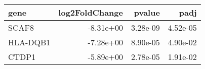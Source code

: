 \begin{tabular}{lrrr}
\toprule
    gene &  log2FoldChange &   pvalue &     padj \\
\midrule
   SCAF8 &       -8.31e+00 & 3.28e-09 & 4.52e-05 \\
HLA-DQB1 &       -7.28e+00 & 8.90e-05 & 4.90e-02 \\
   CTDP1 &       -5.89e+00 & 2.78e-05 & 1.91e-02 \\
\bottomrule
\end{tabular}
